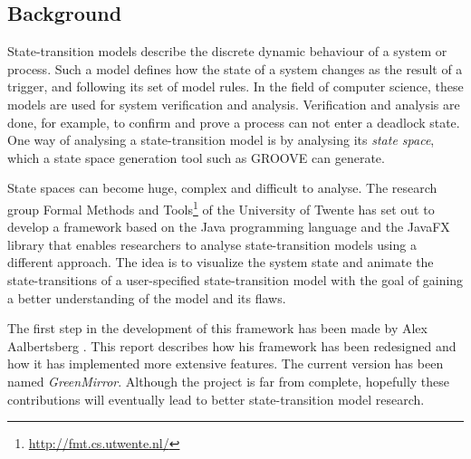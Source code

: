 \subsection{Background}\label{sec:intro;sub:bg}
State-transition models describe the discrete dynamic behaviour of a system or process. Such a model defines how the state of a system changes as the result of a trigger, and following its set of model rules. In the field of computer science, these models are used for system verification and analysis. Verification and analysis are done, for example, to confirm and prove a process can not enter a deadlock state. One way of analysing a state-transition model is by analysing its \emph{state space}, which a state space generation tool such as GROOVE \cite{rensink2004} can generate. 
\par State spaces can become huge, complex and difficult to analyse. The research group Formal Methods and Tools\footnote{\url{http://fmt.cs.utwente.nl/}} of the University of Twente has set out to develop a framework based on the Java programming language and the JavaFX library that enables researchers to analyse state-transition models using a different approach. The idea is to visualize the system state and animate the state-transitions of a user-specified state-transition model with the goal of gaining a better understanding of the model and its flaws.
\par The first step in the development of this framework has been made by Alex Aalbertsberg \cite{aalbertsberg2015}. This report describes how his framework has been redesigned and how it has implemented more extensive features. The current version has been named \emph{GreenMirror}. Although the project is far from complete, hopefully these contributions will eventually lead to better state-transition model research.
